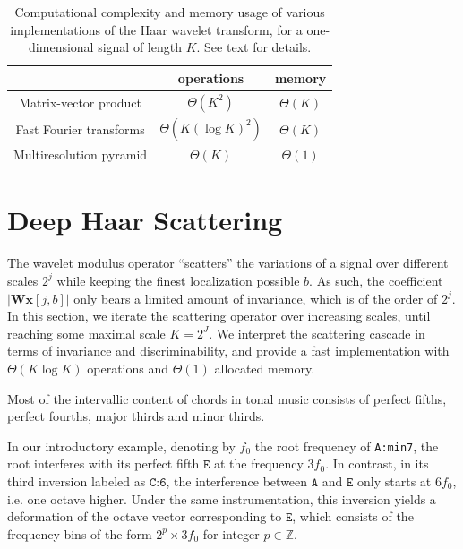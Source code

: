 \documentclass{article}
\makeatletter
\newcommand*{\ie}{i.e.\@\xspace}
\makeatother
\begin{document}
\begin{table}
	\begin{center}
	\begin{tabular}{|c|cc|}
		\hline
		& operations & memory \\
		\hline
		Matrix-vector product & $\Theta(K^2)$ & $\Theta(K)$ \\
		Fast Fourier transforms & $\Theta(K (\log K)^2)$ & $\Theta(K)$ \\
		Multiresolution pyramid & $\Theta(K)$ & $\Theta(1)$ \\
		\hline		
	\end{tabular}
	\end{center}
	\caption{
	Computational complexity and memory usage of various implementations
	of the Haar wavelet transform, for a one-dimensional signal of length $K$.
	See text for details.
	\label{table:wavelet-complexities}}
\end{table}


\section{Deep Haar Scattering}\label{sec:scattering}
The wavelet modulus operator ``scatters'' the variations of a signal over
different scales $2^j$ while keeping the finest localization possible $b$.
As such, the coefficient $\vert \mathbf{W} \boldsymbol{x}[j, b] \vert$
only bears a limited amount of invariance, which is of the order
of $2^j$.
In this section, we iterate the scattering operator over increasing scales,
until reaching some maximal scale $K=2^J$.
We interpret the scattering cascade in terms of invariance and discriminability,
and provide a fast implementation with $\Theta(K \log K)$ operations
and $\Theta(1)$ allocated memory.

Most of the intervallic content of chords in tonal music consists of perfect fifths,
perfect fourths, major thirds and minor thirds.

In our introductory example, denoting by $f_0$ the root frequency of \texttt{A:min7},
the root interferes with its perfect fifth $\texttt{E}$ at the frequency $3 f_0$.
In contrast, in its third inversion labeled as $\texttt{C:6}$, the interference
between $\texttt{A}$ and $\texttt{E}$ only starts at $6 f_0$, \ie one octave higher.
Under the same instrumentation, this inversion yields a deformation of the
octave vector corresponding to $\texttt{E}$, which consists of the frequency bins
of the form $2^p \times 3 f_0$ for integer $p \in \mathbb{Z}$.
\end{document}
